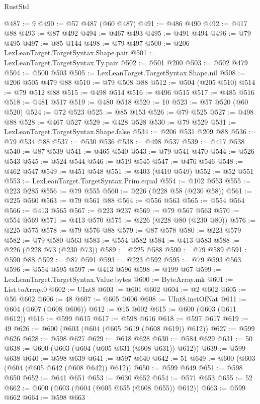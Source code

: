 \begin{lexlean}{RustStd}
\begin{coremodule}
@487 := 9
@490 := @57 @487 (@60 @487)
@491 := @486 @490
@492 := @417 @88
@493 := @87 @492
@494 := @467 @493
@495 := @491 @494
@496 := @79 @495
@497 := @85 @144
@498 := @79 @497
@500 := @206 LexLeanTarget.TargetSyntax.Shape.pair
@501 := LexLeanTarget.TargetSyntax.Ty.pair
@502 := @501 @200
@503 := @502 @479
@504 := @500 @503
@505 := LexLeanTarget.TargetSyntax.Shape.nil
@508 := @206 @505 @479 @88
@510 := @79 @508 @88
@512 := @504 (@205 @510)
@514 := @79 @512 @88
@515 := @498 @514
@516 := @496 @515
@517 := @485 @516
@518 := @481 @517
@519 := @480 @518
@520 := 10
@523 := @57 @520 (@60 @520)
@524 := @72 @523
@525 := @85 @153
@526 := @79 @525
@527 := @498 @88
@528 := @467 @527
@529 := @428 @528
@530 := @79 @529
@531 := LexLeanTarget.TargetSyntax.Shape.false
@534 := @206 @531 @209 @88
@536 := @79 @534 @88
@537 := @530 @536
@538 := @498 @537
@539 := @417 @538
@540 := @87 @539
@541 := @465 @540
@543 := @79 @541 @470
@544 := @526 @543
@545 := @524 @544
@546 := @519 @545
@547 := @476 @546
@548 := @462 @547
@549 := @451 @548
@551 := @403 (@410 @549)
@552 := @52 @551
@553 := LexLeanTarget.TargetSyntax.Prim.equal
@554 := @102 @553
@555 := @223 @285
@556 := @79 @555
@560 := @226 (@228 @58 (@230 @58))
@561 := @225 @560
@563 := @79 @561 @88
@564 := @556 @563
@565 := @554 @564
@566 := @413 @565
@567 := @223 @237
@569 := @79 @567 @563
@570 := @554 @569
@571 := @413 @570
@575 := @226 (@228 @80 (@230 @80))
@576 := @225 @575
@578 := @79 @576 @88
@579 := @87 @578
@580 := @223 @579
@582 := @79 @580 @563
@583 := @554 @582
@584 := @413 @583
@588 := @226 (@228 @73 (@230 @73))
@589 := @225 @588
@590 := @79 @589
@591 := @590 @88
@592 := @87 @591
@593 := @223 @592
@595 := @79 @593 @563
@596 := @554 @595
@597 := @413 @596
@598 := @199 @67
@599 := LexLeanTarget.TargetSyntax.Value.bytes
@600 := ByteArray.mk
@601 := List.toArray.{0}
@602 := UInt8
@603 := @601 @602
@604 := @2 @602
@605 := @56 @602
@606 := 48
@607 := @605 @606
@608 := UInt8.instOfNat
@611 := @604 (@607 (@608 @606))
@612 := @15 @602
@615 := @600 (@603 (@611 @612))
@616 := @599 @615
@617 := @598 @616
@618 := @597 @617
@619 := 49
@626 := @600 (@603 (@604 (@605 @619 (@608 @619)) @612))
@627 := @599 @626
@628 := @598 @627
@629 := @618 @628
@630 := @584 @629
@631 := 50
@638 := @600 (@603 (@604 (@605 @631 (@608 @631)) @612))
@639 := @599 @638
@640 := @598 @639
@641 := @597 @640
@642 := 51
@649 := @600 (@603 (@604 (@605 @642 (@608 @642)) @612))
@650 := @599 @649
@651 := @598 @650
@652 := @641 @651
@653 := @630 @652
@654 := @571 @653
@655 := 52
@662 := @600 (@603 (@604 (@605 @655 (@608 @655)) @612))
@663 := @599 @662
@664 := @598 @663

\end{coremodule}
\end{lexlean}
